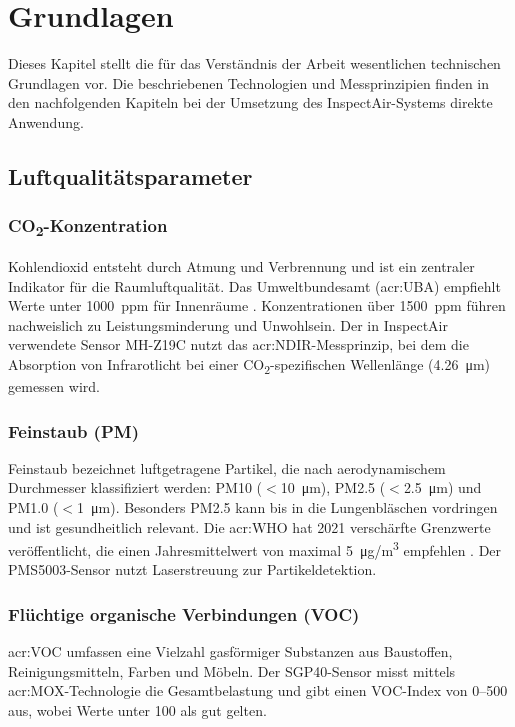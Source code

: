 \chapter{Grundlagen}
\label{cha:Grundlagen}

Dieses Kapitel stellt die für das Verständnis der Arbeit wesentlichen technischen Grundlagen vor. Die beschriebenen Technologien und Messprinzipien finden in den nachfolgenden Kapiteln bei der Umsetzung des InspectAir-Systems direkte Anwendung.

\section{Luftqualitätsparameter}
\label{sec:luftqualitaet}

\subsection{CO\textsubscript{2}-Konzentration}
Kohlendioxid entsteht durch Atmung und Verbrennung und ist ein zentraler Indikator für die Raumluftqualität. Das Umweltbundesamt (\acrshort{acr:UBA}) empfiehlt Werte unter \SI{1000}{ppm} für Innenräume \autocite{UBA.2008}. Konzentrationen über \SI{1500}{ppm} führen nachweislich zu Leistungsminderung und Unwohlsein. Der in InspectAir verwendete Sensor MH-Z19C nutzt das \acrshort{acr:NDIR}-Messprinzip, bei dem die Absorption von Infrarotlicht bei einer CO\textsubscript{2}-spezifischen Wellenlänge (\SI{4,26}{\micro\metre}) gemessen wird.

\subsection{Feinstaub (PM)}
Feinstaub bezeichnet luftgetragene Partikel, die nach aerodynamischem Durchmesser klassifiziert werden: PM10 ($<$\SI{10}{\micro\metre}), PM2.5 ($<$\SI{2,5}{\micro\metre}) und PM1.0 ($<$\SI{1}{\micro\metre}). Besonders PM2.5 kann bis in die Lungenbläschen vordringen und ist gesundheitlich relevant. Die \acrshort{acr:WHO} hat 2021 verschärfte Grenzwerte veröffentlicht, die einen Jahresmittelwert von maximal \SI{5}{\micro\gram/\metre\cubed} empfehlen \autocite{WHO.2021}. Der PMS5003-Sensor nutzt Laserstreuung zur Partikeldetektion.

\subsection{Flüchtige organische Verbindungen (VOC)}
\acrshort{acr:VOC} umfassen eine Vielzahl gasförmiger Substanzen aus Baustoffen, Reinigungsmitteln, Farben und Möbeln. Der SGP40-Sensor misst mittels \acrshort{acr:MOX}-Technologie die Gesamtbelastung und gibt einen VOC-Index von 0--500 aus, wobei Werte unter 100 als \glqq gut\grqq{} gelten.

